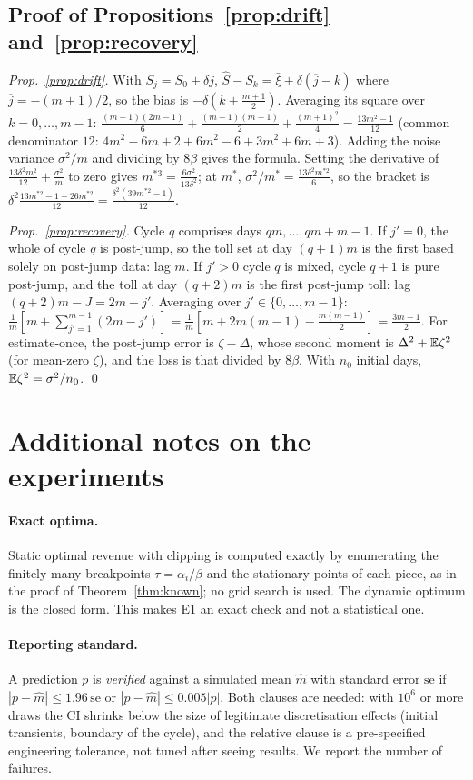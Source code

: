 \subsection{Proof of Propositions~\ref{prop:drift} and~\ref{prop:recovery}}
\emph{Prop.~\ref{prop:drift}.} With $S_j=S_0+\delta j$, $\hat S-S_k=\bar\xi+\delta(\overline{j}-k)$ where $\overline j=-(m+1)/2$, so the bias is $-\delta(k+\frac{m+1}2)$. Averaging its square over $k=0,\dots,m-1$: $\frac{(m-1)(2m-1)}6+\frac{(m+1)(m-1)}2+\frac{(m+1)^2}4=\frac{13m^2-1}{12}$ (common denominator $12$: $4m^2-6m+2+6m^2-6+3m^2+6m+3$). Adding the noise variance $\sigma^2/m$ and dividing by $8\beta$ gives the formula. Setting the derivative of $\frac{13\delta^2m^2}{12}+\frac{\sigma^2}m$ to zero gives $m^{*3}=\frac{6\sigma^2}{13\delta^2}$; at $m^*$, $\sigma^2/m^*=\frac{13\delta^2m^{*2}}6$, so the bracket is $\delta^2\frac{13m^{*2}-1+26m^{*2}}{12}=\frac{\delta^2(39m^{*2}-1)}{12}$.

\emph{Prop.~\ref{prop:recovery}.} Cycle $q$ comprises days $qm,\dots,qm+m-1$. If $j'=0$, the whole of cycle $q$ is post-jump, so the toll set at day $(q+1)m$ is the first based solely on post-jump data: lag $m$. If $j'>0$ cycle $q$ is mixed, cycle $q+1$ is pure post-jump, and the toll at day $(q+2)m$ is the first post-jump toll: lag $(q+2)m-J=2m-j'$. Averaging over $j'\in\{0,\dots,m-1\}$: $\frac1m[m+\sum_{j'=1}^{m-1}(2m-j')]=\frac1m[m+2m(m-1)-\frac{m(m-1)}2]=\frac{3m-1}2$. For estimate-once, the post-jump error is $\zeta-\Delta$, whose second moment is $\Delta^2+\mathbb{E}\zeta^2$ (for mean-zero $\zeta$), and the loss is that divided by $8\beta$. With $n_0$ initial days, $\mathbb{E}\zeta^2=\sigma^2/n_0$. \qed

\section{Additional notes on the experiments}\label{app:repro}
\paragraph{Exact optima.} Static optimal revenue with clipping is computed exactly by enumerating the finitely many breakpoints $\tau=\alpha_i/\beta$ and the stationary points of each piece, as in the proof of Theorem~\ref{thm:known}; no grid search is used. The dynamic optimum is the closed form. This makes E1 an exact check and not a statistical one.

\paragraph{Reporting standard.} A prediction $p$ is \emph{verified} against a simulated mean $\hat m$ with standard error $\mathrm{se}$ if $|p-\hat m|\le1.96\,\mathrm{se}$ or $|p-\hat m|\le0.005|p|$. Both clauses are needed: with $10^6$ or more draws the CI shrinks below the size of legitimate discretisation effects (initial transients, boundary of the cycle), and the relative clause is a pre-specified engineering tolerance, not tuned after seeing results. We report the number of failures.

